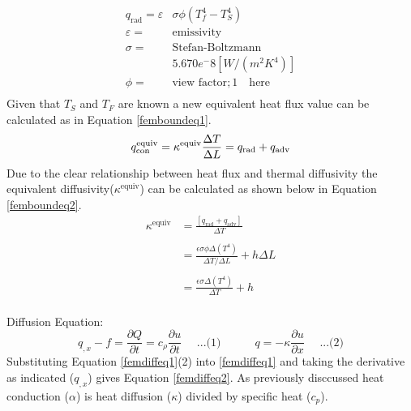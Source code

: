 	\begin{equation} \label{radeq}
	       \begin{aligned}
	       q_{\text{rad}} = \varepsilon&\sigma \phi \left(T_f^4 - T_S^4\right)\\
	       \varepsilon =& \text{emissivity}\\
	       \sigma =& \text{Stefan-Boltzmann} \\&5.670 e^-8 [W/(m^2K^4)]\\
	       \phi =& \text{view factor};1 \quad \text{here}\\
	       \end{aligned}
	\end{equation}
	Given that $T_S$ and $T_F$ are known a new equivalent heat flux value can be calculated as in Equation \ref{femboundeq1}.
	\begin{equation} \label{femboundeq1}
	q_{\text{con}}^{\text{equiv}} = \kappa^{\text{equiv}} \frac{\Delta T}{\Delta L} = q_{\text{rad}} + q_{\text{adv}}\\
	\end{equation}
	Due to the clear relationship between heat flux and thermal diffusivity the equivalent diffusivity($\kappa^{\text{equiv}}$) can be calculated as shown below in Equation \ref{femboundeq2}. 
	\begin{equation}\label{femboundeq2}
	\begin{aligned}
	\kappa^{\text{equiv}} &= \frac{\left[q_{\text{rad}} + q_{\text{adv}} \right]}{\Delta T}\\
	&\quad\\
	&= \frac{\epsilon \sigma \phi \Delta \left(T^4\right)}{\Delta T / \Delta L } + h \Delta L\\
	&\quad\\
	&= \frac{\epsilon \sigma \Delta \left(T^4\right)}{\Delta T   } + h\\
	\end{aligned}
	\end{equation}
	
Diffusion Equation: 
	\begin{equation}\label{femdiffeq1}
	q_{,x} - f = \frac{\partial Q}{\partial t} = c_{\rho}\frac{\partial u}{\partial t}\quad\text{  ...(1)} \quad\quad\quad q = -\kappa \frac{\partial u}{\partial x}\quad\text{  ...(2)}
\end{equation}
Substituting Equation \ref{femdiffeq1}(2) into \ref{femdiffeq1} and taking the derivative as indicated ($q_{,x}$) gives Equation \ref{femdiffeq2}. 
As previously disccussed heat conduction ($\alpha$) is heat diffusion ($\kappa$)  divided by specific heat ($c_p$).


